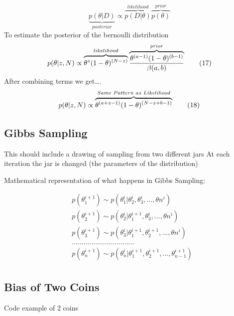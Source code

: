 \documentclass[]{book}
\theoremstyle{definition}
\theoremstyle{definition}
\theoremstyle{definition}
\theoremstyle{remark}
\begin{document}
\[
\underbrace{p(\theta|D)}_{posterior}  \propto  {\overbrace{p(D|\theta)}^{likelihood}
  \overbrace{p(\theta)}^{prior}}
\tag{16}
\] To estimate the posterior of the bernoulli distribution \[
p(\theta|z,N) \propto \overbrace{\theta^z(1-\theta)^{(N-z)}}^{likelihood} \overbrace{{\theta^{(a-1)}(1-\theta)^{(b-1)}}\over \beta(a,b)}^{prior}
\tag{17}
\] After combining terms we get\ldots{}. \[
p(\theta|z,N) \propto \overbrace{\theta^{(a + z -1)}(1-\theta)^{(N-z+b-1)}}^{Same \hspace{1 mm} Pattern \hspace{1 mm} as \hspace{1 mm} Likelihood}
\tag{18}
\]

\subsection{Gibbs Sampling}\label{gibbs-sampling}

This should include a drawing of sampling from two different jars At
each iteration the jar is changed (the parameters of the distribution)

Mathematical representation of what happens in Gibbs Sampling:

\[
\begin{aligned}
&p(\theta_{1}^{i+1}) \sim p(\theta_{1}^{i}|\theta_{2}^{i}, \theta_{3}^{i},..., \theta{n}^{i}) \\
&p(\theta_{2}^{i+1}) \sim p(\theta_{2}^{i}|\theta_{1}^{i+1}, \theta_{3}^{i},..., \theta{n}^{i}) \\
&p(\theta_{3}^{i+1}) \sim p(\theta_{3}^{i}|\theta_{1}^{i+1}, \theta_{2}^{i+1},..., \theta{n}^{i}) \\
&................................ \\ 
&p(\theta_{n}^{i+1}) \sim p(\theta_{n}^{i}|\theta_{1}^{i+1}, \theta_{2}^{i+1},..., \theta_{n-1}^{i+1}) \\
\end{aligned}
\tag{19}
\]

\subsection{Bias of Two Coins}\label{bias-of-two-coins}

Code example of 2 coins
\end{document}
